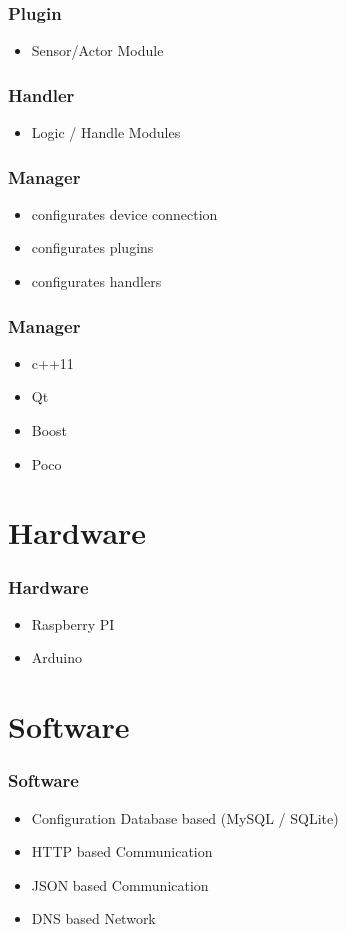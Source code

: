 \begin{frame}
	\frametitle{Plugin}
	\begin{itemize}
		\item Sensor/Actor Module
	\end{itemize}
\end{frame}

\begin{frame}
	\frametitle{Handler}
	\begin{itemize}
		\item Logic / Handle Modules
	\end{itemize}
\end{frame}

\begin{frame}
	\frametitle{Manager}
	\begin{itemize}
		\item configurates device connection
		\item configurates plugins
		\item configurates handlers
	\end{itemize}
\end{frame}

\begin{frame}
	\frametitle{Manager}
	\begin{itemize}
		\item c++11
		\item Qt
		\item Boost
		\item Poco
	\end{itemize}
\end{frame}

\section{Hardware}
\begin{frame}
	\frametitle{Hardware}
	\begin{itemize} 
		\item Raspberry PI
		\item Arduino
	\end{itemize}
\end{frame}

\section{Software}
\begin{frame}
	\frametitle{Software}
	\begin{itemize}
		\item Configuration Database based (MySQL / SQLite)
		\item HTTP based Communication
		\item JSON based Communication
		\item DNS based Network
	\end{itemize}
\end{frame}

